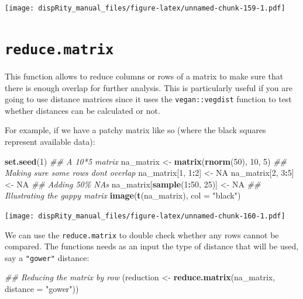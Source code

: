 \documentclass[
]{book}
\newenvironment{Shaded}{\begin{snugshade}}{\end{snugshade}}
\newcommand{\CommentTok}[1]{\textcolor[rgb]{0.56,0.35,0.01}{\textit{#1}}}
\newcommand{\DataTypeTok}[1]{\textcolor[rgb]{0.13,0.29,0.53}{#1}}
\newcommand{\DecValTok}[1]{\textcolor[rgb]{0.00,0.00,0.81}{#1}}
\newcommand{\KeywordTok}[1]{\textcolor[rgb]{0.13,0.29,0.53}{\textbf{#1}}}
\newcommand{\NormalTok}[1]{#1}
\newcommand{\OperatorTok}[1]{\textcolor[rgb]{0.81,0.36,0.00}{\textbf{#1}}}
\newcommand{\OtherTok}[1]{\textcolor[rgb]{0.56,0.35,0.01}{#1}}
\newcommand{\StringTok}[1]{\textcolor[rgb]{0.31,0.60,0.02}{#1}}
\begin{document}
\texttt{[image: dispRity\_manual\_files/figure-latex/unnamed-chunk-159-1.pdf]}

\hypertarget{reduce.matrix}{%
\section{\texorpdfstring{\texttt{reduce.matrix}}{reduce.matrix}}\label{reduce.matrix}}

This function allows to reduce columns or rows of a matrix to make sure that there is enough overlap for further analysis.
This is particularly useful if you are going to use distance matrices since it uses the \texttt{vegan::vegdist} function to test whether distances can be calculated or not.

For example, if we have a patchy matrix like so (where the black squares represent available data):

\begin{Shaded}
\begin{Highlighting}[]
\KeywordTok{set.seed}\NormalTok{(}\DecValTok{1}\NormalTok{)}
\CommentTok{\#\# A 10*5 matrix}
\NormalTok{na\_matrix \textless{}{-}}\StringTok{ }\KeywordTok{matrix}\NormalTok{(}\KeywordTok{rnorm}\NormalTok{(}\DecValTok{50}\NormalTok{), }\DecValTok{10}\NormalTok{, }\DecValTok{5}\NormalTok{)}
\CommentTok{\#\# Making sure some rows don\textquotesingle{}t overlap}
\NormalTok{na\_matrix[}\DecValTok{1}\NormalTok{, }\DecValTok{1}\OperatorTok{:}\DecValTok{2}\NormalTok{] \textless{}{-}}\StringTok{ }\OtherTok{NA}
\NormalTok{na\_matrix[}\DecValTok{2}\NormalTok{, }\DecValTok{3}\OperatorTok{:}\DecValTok{5}\NormalTok{] \textless{}{-}}\StringTok{ }\OtherTok{NA}
\CommentTok{\#\# Adding 50\% NAs}
\NormalTok{na\_matrix[}\KeywordTok{sample}\NormalTok{(}\DecValTok{1}\OperatorTok{:}\DecValTok{50}\NormalTok{, }\DecValTok{25}\NormalTok{)] \textless{}{-}}\StringTok{ }\OtherTok{NA}
\CommentTok{\#\# Illustrating the gappy matrix}
\KeywordTok{image}\NormalTok{(}\KeywordTok{t}\NormalTok{(na\_matrix), }\DataTypeTok{col =} \StringTok{"black"}\NormalTok{)}
\end{Highlighting}
\end{Shaded}

\texttt{[image: dispRity\_manual\_files/figure-latex/unnamed-chunk-160-1.pdf]}

We can use the \texttt{reduce.matrix} to double check whether any rows cannot be compared.
The functions needs as an input the type of distance that will be used, say a \texttt{"gower"} distance:

\begin{Shaded}
\begin{Highlighting}[]
\CommentTok{\#\# Reducing the matrix by row}
\NormalTok{(reduction \textless{}{-}}\StringTok{ }\KeywordTok{reduce.matrix}\NormalTok{(na\_matrix, }\DataTypeTok{distance =} \StringTok{"gower"}\NormalTok{))}
\end{Highlighting}
\end{Shaded}
\end{document}
